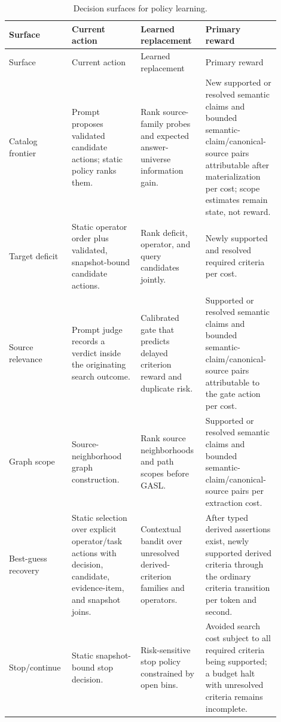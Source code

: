 \documentclass[11pt]{article}
\begin{document}
\begin{longtable}{@{}p{0.18\linewidth}p{0.24\linewidth}p{0.22\linewidth}p{0.26\linewidth}@{}}
\caption{Decision surfaces for policy learning.}
\label{tab:policies}\\
\toprule
Surface & Current action & Learned replacement & Primary reward \\
\midrule
\endfirsthead
\toprule
Surface & Current action & Learned replacement & Primary reward \\
\midrule
\endhead
\bottomrule
\endfoot
Catalog frontier &
Prompt proposes validated candidate actions; static policy ranks them. &
Rank source-family probes and expected answer-universe information gain. &
New supported or resolved semantic claims and bounded
semantic-claim/canonical-source pairs attributable after
materialization per cost; scope estimates remain state, not reward. \\
\addlinespace
Target deficit &
Static operator order plus validated, snapshot-bound candidate actions. &
Rank deficit, operator, and query candidates jointly. &
Newly supported and resolved required criteria per cost. \\
\addlinespace
Source relevance &
Prompt judge records a verdict inside the originating search outcome. &
Calibrated gate that predicts delayed criterion reward and duplicate risk. &
Supported or resolved semantic claims and bounded
semantic-claim/canonical-source pairs attributable to the
gate action per cost. \\
\addlinespace
Graph scope &
Source-neighborhood graph construction. &
Rank source neighborhoods and path scopes before GASL. &
Supported or resolved semantic claims and bounded
semantic-claim/canonical-source pairs per extraction cost. \\
\addlinespace
Best-guess recovery &
Static selection over explicit operator/task actions with decision, candidate,
evidence-item, and snapshot joins. &
Contextual bandit over unresolved derived-criterion families and operators. &
After typed derived assertions exist, newly supported derived criteria through
the ordinary criteria transition per token and second. \\
\addlinespace
Stop/continue &
Static snapshot-bound stop decision. &
Risk-sensitive stop policy constrained by open bins. &
Avoided search cost subject to all required criteria being supported; a budget
halt with unresolved criteria remains incomplete. \\
\end{longtable}
\end{document}
